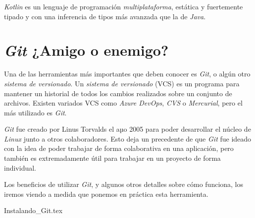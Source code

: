     \textit{Kotlin} es un lenguaje de programación \textit{multiplataforma}, estática y fuertemente 
    tipado y con una inferencia de tipos más avanzada que la de \textit{Java}.
  
  \chapter{\textit{Git} ¿Amigo o enemigo?}
    Una de las herramientas más importantes que deben conocer es \textit{Git}, o algún 
    otro \textit{sistema de versionado}.
    Un \textit{sistema de versionado} (VCS) es un programa para mantener un historial de todos los 
    cambios realizados sobre un conjunto de archivos.
    Existen variados VCS como \textit{Azure DevOps}, \textit{CVS} o \textit{Mercurial}, pero el más
    utilizado es \textit{Git}.

    \textit{Git} fue creado por Linus Torvalds el aµo 2005 para poder desarrollar el núcleo de 
    \textit{Linux} junto a otros colaboradores.
    Esto deja un precedente de que \textit{Git} fue ideado con la idea de poder trabajar de forma
    colaborativa en una aplicación, pero también es extremadamente útil para trabajar en un proyecto
    de forma individual.

    Los beneficios de utilizar \textit{Git}, y algunos otros detalles sobre cómo funciona, los 
    iremos viendo a medida que ponemos en práctica esta herramienta.

    {Instalando_Git.tex}
    \nocite{*}
    \printbibliography[keyword=git]

